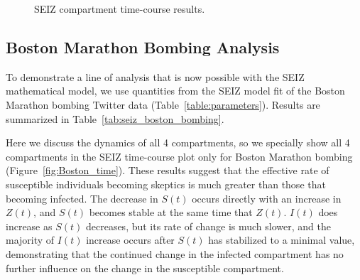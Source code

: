 \begin{figure}[t]
{   \label{fig:Obama_time}
 }
\vspace{-0.5em}
\caption{SEIZ compartment time-course results.
\label{fig:Time_course}
}
\end{figure}


\subsection{Boston Marathon Bombing Analysis}

To demonstrate a line of analysis that is now possible with the SEIZ mathematical model, we use quantities from the SEIZ model fit of the Boston Marathon bombing Twitter data (Table~\ref{table:parameters}). Results are summarized in Table~\ref{tab:seiz_boston_bombing}.

Here we discuss the dynamics of all 4 compartments, so we specially show all 4 compartments in the SEIZ time-course plot only for Boston Marathon bombing (Figure~\ref{fig:Boston_time}). These results suggest that the effective rate of susceptible individuals becoming skeptics is much greater than those that becoming infected. The decrease in $S(t)$ occurs directly with an increase in $Z(t)$, and $S(t)$ becomes stable at the same time that $Z(t)$. $I(t)$ does increase as $S(t)$ decreases, but its rate of change is much slower, and the majority of $I(t)$ increase occurs after $S(t)$ has stabilized to a minimal value, demonstrating that the continued change in the infected compartment has no further influence on the change in the susceptible compartment.

